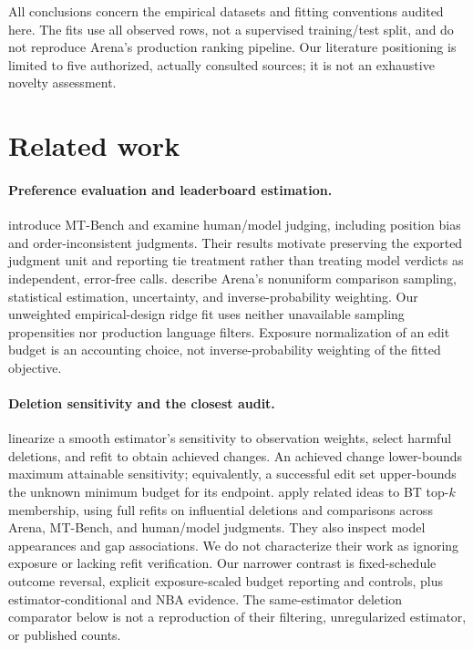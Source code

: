 \documentclass{article}
\begin{document}
All conclusions concern the empirical datasets and fitting conventions audited here. The fits use all observed rows, not a supervised training/test split, and do not reproduce Arena's production ranking pipeline. Our literature positioning is limited to five authorized, actually consulted sources; it is not an exhaustive novelty assessment.

\section{Related work}
\label{sec:related}
\paragraph{Preference evaluation and leaderboard estimation.}
\citet{zheng2023judging} introduce MT-Bench and examine human/model judging, including position bias and order-inconsistent judgments. Their results motivate preserving the exported judgment unit and reporting tie treatment rather than treating model verdicts as independent, error-free calls. \citet{chiang2024chatbot} describe Arena's nonuniform comparison sampling, statistical estimation, uncertainty, and inverse-probability weighting. Our unweighted empirical-design ridge fit uses neither unavailable sampling propensities nor production language filters. Exposure normalization of an edit budget is an accounting choice, not inverse-probability weighting of the fitted objective.

\paragraph{Deletion sensitivity and the closest audit.}
\citet{broderick2020automatic} linearize a smooth estimator's sensitivity to observation weights, select harmful deletions, and refit to obtain achieved changes. An achieved change lower-bounds maximum attainable sensitivity; equivalently, a successful edit set upper-bounds the unknown minimum budget for its endpoint. \citet{huang2025dropping} apply related ideas to BT top-$k$ membership, using full refits on influential deletions and comparisons across Arena, MT-Bench, and human/model judgments. They also inspect model appearances and gap associations. We do not characterize their work as ignoring exposure or lacking refit verification. Our narrower contrast is fixed-schedule outcome reversal, explicit exposure-scaled budget reporting and controls, plus estimator-conditional and NBA evidence. The same-estimator deletion comparator below is not a reproduction of their filtering, unregularized estimator, or published counts.
\end{document}
